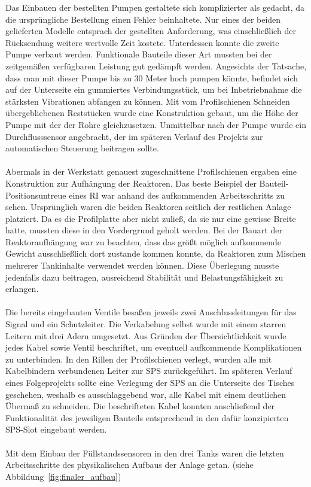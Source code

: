 	Das Einbauen der bestellten Pumpen gestaltete sich komplizierter als gedacht, da die ursprüngliche Bestellung einen Fehler beinhaltete. Nur eines der beiden gelieferten Modelle entsprach der gestellten Anforderung, was einschließlich der Rücksendung weitere wertvolle Zeit kostete. Unterdessen konnte die zweite Pumpe verbaut werden. Funktionale Bauteile dieser Art mussten bei der zeitgemäßen verfügbaren Leistung gut gedämpft werden. Angesichts der Tatsache, dass man mit dieser Pumpe bis zu 30 Meter hoch pumpen könnte, befindet sich auf der Unterseite ein gummiertes Verbindungsstück, um bei Inbetriebnahme die stärksten Vibrationen abfangen zu können. Mit vom Profilschienen Schneiden übergebliebenen Reststücken wurde eine Konstruktion gebaut, um die Höhe der Pumpe mit der der Rohre gleichzusetzen. Unmittelbar nach der Pumpe wurde ein Durchflusssensor angebracht, der im späteren Verlauf des Projekts zur automatischen Steuerung beitragen sollte.\\\\
	Abermals in der Werkstatt genauest zugeschnittene Profilschienen ergaben eine Konstruktion zur Aufhängung der Reaktoren. Das beste Beispiel der Bauteil-Positionsuntreue eines \ac{RI} war anhand des aufkommenden Arbeitsschritts zu sehen. Ursprünglich waren die beiden Reaktoren seitlich der restlichen Anlage platziert. Da es die Profilplatte aber nicht zuließ, da sie nur eine gewisse Breite hatte, mussten diese in den Vordergrund geholt werden. Bei der Bauart der Reaktoraufhängung war zu beachten, dass das größt möglich aufkommende Gewicht ausschließlich dort zustande kommen konnte, da Reaktoren zum Mischen mehrerer Tankinhalte verwendet werden können. Diese Überlegung musste jedenfalls dazu beitragen, ausreichend Stabilität und Belastungsfähigkeit zu erlangen.\\\\
	Die bereits eingebauten Ventile besaßen jeweils zwei Anschlussleitungen für das Signal und ein Schutzleiter. Die Verkabelung selbst wurde mit einem starren Leitern mit drei Adern umgesetzt. Aus Gründen der Übersichtlichkeit wurde jedes Kabel sowie Ventil beschriftet, um eventuell aufkommende Komplikationen zu unterbinden. In den Rillen der Profilschienen verlegt, wurden alle mit Kabelbindern verbundenen Leiter zur \ac{SPS} zurückgeführt. Im späteren Verlauf eines Folgeprojekts sollte eine Verlegung der \ac{SPS} an die Unterseite des Tisches geschehen, weshalb es ausschlaggebend war, alle Kabel mit einem deutlichen Übermaß zu schneiden. Die beschrifteten Kabel konnten anschließend der Funktionalität des jeweiligen Bauteils entsprechend in den dafür konzipierten \ac{SPS}-Slot eingebaut werden.\\\\
	Mit dem Einbau der Füllstandssensoren in den drei Tanks waren die letzten Arbeitsschritte des physikalischen Aufbaus der Anlage getan. (siehe Abbildung~\ref{fig:finaler_aufbau})
	

